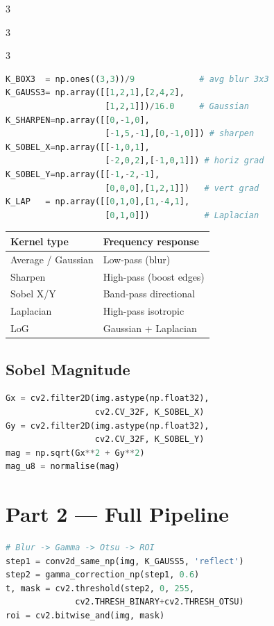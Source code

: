 \documentclass[9pt,landscape,a4paper]{extarticle}
\begin{document}
\begin{multicols*}{3}
\begin{multicols*}{3}
\begin{multicols}{3}
\begin{lstlisting}[language=Python]
K_BOX3  = np.ones((3,3))/9             # avg blur 3x3
K_GAUSS3= np.array([[1,2,1],[2,4,2],
                    [1,2,1]])/16.0     # Gaussian
K_SHARPEN=np.array([[0,-1,0],
                    [-1,5,-1],[0,-1,0]]) # sharpen
K_SOBEL_X=np.array([[-1,0,1],
                    [-2,0,2],[-1,0,1]]) # horiz grad
K_SOBEL_Y=np.array([[-1,-2,-1],
                    [0,0,0],[1,2,1]])   # vert grad
K_LAP   = np.array([[0,1,0],[1,-4,1],
                    [0,1,0]])           # Laplacian
\end{lstlisting}

\begin{center}
\small
\begin{tabular}{@{}ll@{}}
\toprule
Kernel type & Frequency response \\
\midrule
Average / Gaussian & Low-pass (blur) \\
Sharpen & High-pass (boost edges) \\
Sobel X/Y & Band-pass directional \\
Laplacian & High-pass isotropic \\
LoG & Gaussian + Laplacian \\
\bottomrule
\end{tabular}
\end{center}

\subsection{Sobel Magnitude}
\begin{lstlisting}[language=Python]
Gx = cv2.filter2D(img.astype(np.float32),
                  cv2.CV_32F, K_SOBEL_X)
Gy = cv2.filter2D(img.astype(np.float32),
                  cv2.CV_32F, K_SOBEL_Y)
mag = np.sqrt(Gx**2 + Gy**2)
mag_u8 = normalise(mag)
\end{lstlisting}

\section{Part 2 — Full Pipeline}

\begin{lstlisting}[language=Python]
# Blur -> Gamma -> Otsu -> ROI
step1 = conv2d_same_np(img, K_GAUSS5, 'reflect')
step2 = gamma_correction_np(step1, 0.6)
t, mask = cv2.threshold(step2, 0, 255,
              cv2.THRESH_BINARY+cv2.THRESH_OTSU)
roi = cv2.bitwise_and(img, mask)
\end{lstlisting}


\end{multicols}
\end{multicols*}
\end{multicols*}
\end{document}
